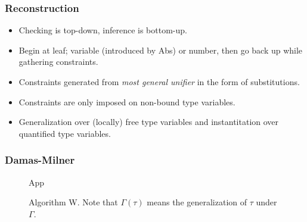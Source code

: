 \documentclass{beamer}
\begin{document}
\begin{frame}
\frametitle{Reconstruction}
    \begin{itemize}
        \item Checking is top-down, inference is bottom-up.
        \item Begin at leaf; variable (introduced by Abs) or number, then go back up while gathering constraints.
        \item Constraints generated from \textit{most general unifier} in the form of substitutions.
        \item Constraints are only imposed on non-bound type variables.
        \item Generalization over (locally) free type variables and instantitation over quantified type variables.
    \end{itemize}
\end{frame}

\begin{frame}
\frametitle{Damas-Milner}
\begin{figure}
    
            \begin{prooftree}
            \end{prooftree}
            \begin{prooftree}
            \end{prooftree}
    
            \begin{center}
                App
            \end{center}
            \vspace{-0.7cm}
            \begin{prooftree}
            \end{prooftree}
    
            \begin{prooftree}
            \end{prooftree}
      \caption{Algorithm W. Note that $\Gamma(\tau)$ means the generalization of $\tau$ under $\Gamma$.}
        \label{fig:dmrules}
    \end{figure}
\end{frame}
\end{document}

